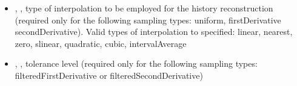 \begin{itemize}
   \item {}, , type of interpolation to be employed for the history reconstruction
                                           (required only for the following sampling types: uniform, firstDerivative secondDerivative).
                                           Valid types of interpolation to specified: linear, nearest, zero, slinear, quadratic, cubic, intervalAverage
   \item {}, , tolerance level (required only for the following sampling types:
                                       filteredFirstDerivative or filteredSecondDerivative)
\end{itemize}
